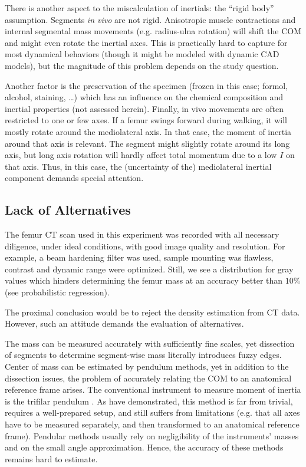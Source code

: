 There is another aspect to the miscalculation of inertials: the ``rigid body'' assumption.
Segments \emph{in vivo} are not rigid.
Anisotropic muscle contractions and internal segmental mass movements (e.g. radius-ulna rotation) will shift the COM and might even rotate the inertial axes.
This is practically hard to capture for most dynamical behaviors (though it might be modeled with dynamic CAD models), but the magnitude of this problem depends on the study question.

Another factor is the preservation of the specimen (frozen in this case; formol, alcohol, staining, \ldots{}) which has an influence on the chemical composition and inertial properties (not assessed herein).
Finally, in vivo movements are often restricted to one or few axes.
If a femur swings forward during walking, it will mostly rotate around the mediolateral axis.
In that case, the moment of inertia around that axis is relevant.
The segment might slightly rotate around its long axis, but long axis rotation will hardly affect total momentum due to a low \(I\) on that axis.
Thus, in this case, the (uncertainty of the) mediolateral inertial component demands special attention.


\subsection{Lack of Alternatives}
\label{sec:orga1d4c07}
The femur CT scan used in this experiment was recorded with all necessary diligence, under ideal conditions, with good image quality and resolution.
For example, a beam hardening filter was used, sample mounting was flawless, contrast and dynamic range were optimized.
Still, we see a distribution for gray values which hinders determining the femur mass at an accuracy better than \(10 \%\) (see probabilistic regression).

The proximal conclusion would be to reject the density estimation from CT data.
However, such an attitude demands the evaluation of alternatives.



The mass can be measured accurately with sufficiently fine scales, yet dissection of segments to determine segment-wise mass literally introduces fuzzy edges.
Center of mass can be estimated by pendulum methods, yet in addition to the dissection issues, the problem of accurately relating the COM to an anatomical reference frame arises.
The conventional instrument to measure moment of inertia is the trifilar pendulum \citep{Korr1962,Wells1987,Schedlinski2001}.
As \citet{Durston2022} have demonstrated, this method is far from trivial, requires a well-prepared setup, and still suffers from limitations (e.g. that all axes have to be measured separately, and then transformed to an anatomical reference frame).
Pendular methods usually rely on negligibility of the instruments' masses and on the small angle approximation.
Hence, the accuracy of these methods remains hard to estimate.


